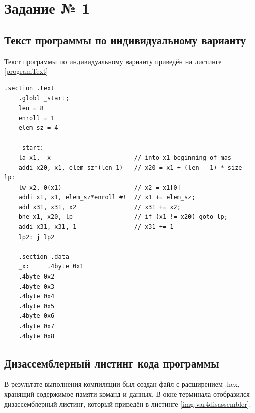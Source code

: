 \chapter{Задание № 1}
\section{Текст программы по индивидуальному варианту}
Текст программы по индивидуальному варианту приведён на листинге \ref{programText}
\begin{lstlisting}[label=programText,caption=Текст программы по индивидуальному варианту]
	.section .text
	.globl _start;
	len = 8
	enroll = 1 
	elem_sz = 4 
	
	_start:
	la x1, _x                       // into x1 beginning of mas
	addi x20, x1, elem_sz*(len-1)   // x20 = x1 + (len - 1) * size
lp:
	lw x2, 0(x1)                    // x2 = x1[0]
	addi x1, x1, elem_sz*enroll #!  // x1 += elem_sz;
	add x31, x31, x2                // x31 += x2;
	bne x1, x20, lp                 // if (x1 != x20) goto lp;
	addi x31, x31, 1                // x31 += 1
	lp2: j lp2
	
	.section .data
	_x:     .4byte 0x1
	.4byte 0x2
	.4byte 0x3
	.4byte 0x4
	.4byte 0x5
	.4byte 0x6
	.4byte 0x7
	.4byte 0x8
\end{lstlisting}

\section{Дизассемблерный листинг кода программы}
В результате выполнения компиляции был создан файл с расширением .hex, хранящий содержимое памяти команд и данных. В окне терминала отобразился дизассемблерный листинг, который приведён в листинге \ref{img:var4disassembler}.

